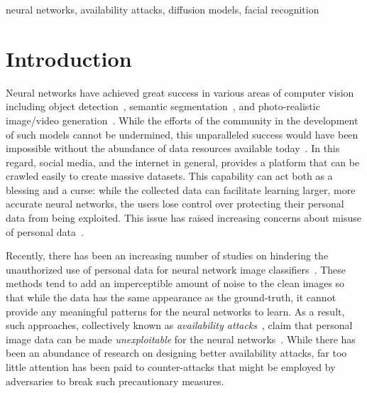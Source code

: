 \documentclass[conference]{IEEEtran}
\theoremstyle{definition}
\theoremstyle{remark}
\theoremstyle{proposition}
\begin{document}
\begin{IEEEkeywords}
neural networks, availability attacks, diffusion models, facial recognition
\end{IEEEkeywords}

\section{Introduction}\label{sec:intro}
Neural networks have achieved great success in various areas of computer vision including object detection~\citep{he2016deep, dosovitskiy2021vit}, semantic segmentation~\citep{zhou2021gmnet, liu2022cmx}, and photo-realistic image/video generation~\citep{karras2020stylegan2, dhariwal2021diffusion, singer2023makeavideo}.
While the efforts of the community in the development of such models cannot be undermined, this unparalleled success would have been impossible without the abundance of data resources available today~\citep{deng2009imagenet, krizhevsky2009learning, russakovsky2015imagenet, lin2014coco}.
In this regard, social media, and the internet in general, provides a platform that can be crawled easily to create massive datasets.
This capability can act both as a blessing and a curse: while the collected data can facilitate learning larger, more accurate neural networks, the users lose control over protecting their personal data from being exploited.
This issue has raised increasing concerns about misuse of personal data~\citep{hill2019photos, hill2020secretive, birhane2021large}.

Recently, there has been an increasing number of studies on hindering the unauthorized use of personal data for neural network image classifiers~\citep{feng2019con, huang2021emn, yuan2021ntga, fowl2021tap, fu2022remn, yu2022shr, tian2022confoundergan, sandoval2022ar}.
These methods tend to add an imperceptible amount of noise to the clean images so that while the data has the same appearance as the ground-truth, it cannot provide any meaningful patterns for the neural networks to learn.
As a result, such approaches, collectively known as \textit{availability attacks}~\citep{biggio2018wild}, claim that personal image data can be made \textit{unexploitable} for the neural networks~\citep{huang2021emn, yu2022shr}.
While there has been an abundance of research on designing better availability attacks, far too little attention has been paid to counter-attacks that might be employed by adversaries to break such precautionary measures.
\end{document}
